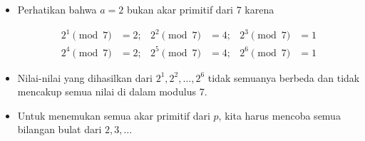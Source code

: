 \documentclass{article}
\begin{document}

\begin{itemize}
    \item Perhatikan bahwa $a = 2$ bukan akar primitif dari 7 karena
    
    \[
    \begin{aligned}
    2^1 \pmod{7} &= 2; & 2^2 \pmod{7} &= 4; & 2^3 \pmod{7} &= 1 \\
    2^4 \pmod{7} &= 2; & 2^5 \pmod{7} &= 4; & 2^6 \pmod{7} &= 1
    \end{aligned}
    \]
    
    \item Nilai-nilai yang dihasilkan dari $2^1, 2^2, \dots, 2^6$ tidak semuanya berbeda dan tidak mencakup semua nilai di dalam modulus 7.
    
    \item Untuk menemukan semua akar primitif dari $p$, kita harus mencoba semua bilangan bulat dari $2, 3, \dots$
\end{itemize}
\end{document}
